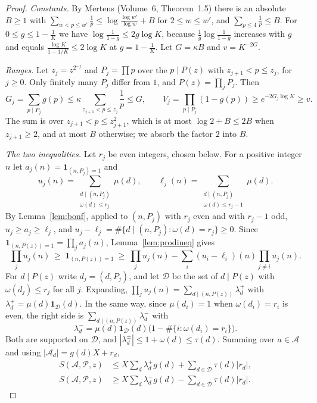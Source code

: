 \begin{proof}
\emph{Constants.} By Mertens (Volume~6, Theorem~1.5) there is an absolute $B\ge1$ with $\sum_{w<p\le w'}\frac1p\le\log\frac{\log w'}{\log w}+B$ for $2\le w\le w'$, and $\sum_{p\le4}\frac1p\le B$. For $0\le g\le1-\frac1K$ we have $\log\frac1{1-g}\le2g\log K$, because $\frac1g\log\frac1{1-g}$ increases with $g$ and equals $\frac{\log K}{1-1/K}\le2\log K$ at $g=1-\frac1K$. Let $G=\kappa B$ and $v=K^{-2G}$.

\emph{Ranges.} Let $z_j=z^{2^{-j}}$ and $P_j=\prod p$ over the $p\mid P(z)$ with $z_{j+1}<p\le z_j$, for $j\ge0$. Only finitely many $P_j$ differ from $1$, and $P(z)=\prod_jP_j$. Then
\[
G_j=\sum_{p\mid P_j}g(p)\le\kappa\sum_{z_{j+1}<p\le z_j}\frac1p\le G,\qquad V_j=\prod_{p\mid P_j}(1-g(p))\ge e^{-2G_j\log K}\ge v.
\]
The sum is over $z_{j+1}<p\le z_{j+1}^2$, which is at most $\log2+B\le2B$ when $z_{j+1}\ge2$, and at most $B$ otherwise; we absorb the factor $2$ into $B$.

\emph{The two inequalities.} Let $r_j$ be even integers, chosen below. For a positive integer $n$ let $a_j(n)=\mathbf 1_{(n,P_j)=1}$ and
\[
u_j(n)=\sum_{\substack{d\mid(n,P_j)\\\omega(d)\le r_j}}\mu(d),\qquad\ell_j(n)=\sum_{\substack{d\mid(n,P_j)\\\omega(d)\le r_j-1}}\mu(d).
\]
By Lemma~\ref{lem:bonf}, applied to $(n,P_j)$ with $r_j$ even and with $r_j-1$ odd, $u_j\ge a_j\ge\ell_j$, and $u_j-\ell_j=\#\{d\mid(n,P_j):\omega(d)=r_j\}\ge0$. Since $\mathbf 1_{(n,P(z))=1}=\prod_ja_j(n)$, Lemma~\ref{lem:prodineq} gives
\[
\prod_ju_j(n)\ \ge\ \mathbf 1_{(n,P(z))=1}\ \ge\ \prod_ju_j(n)-\sum_i(u_i-\ell_i)(n)\prod_{j\ne i}u_j(n).
\]
For $d\mid P(z)$ write $d_j=(d,P_j)$, and let $\mathcal D$ be the set of $d\mid P(z)$ with $\omega(d_j)\le r_j$ for all $j$. Expanding, $\prod_ju_j(n)=\sum_{d\mid(n,P(z))}\lambda^+_d$ with $\lambda^+_d=\mu(d)\mathbf 1_{\mathcal D}(d)$. In the same way, since $\mu(d_i)=1$ when $\omega(d_i)=r_i$ is even, the right side is $\sum_{d\mid(n,P(z))}\lambda^-_d$ with
\[
\lambda^-_d=\mu(d)\mathbf 1_{\mathcal D}(d)\bigl(1-\#\{i:\omega(d_i)=r_i\}\bigr).
\]
Both are supported on $\mathcal D$, and $|\lambda^\pm_d|\le1+\omega(d)\le\tau(d)$. Summing over $a\in\mathcal A$ and using $|\mathcal A_d|=g(d)X+r_d$,
\begin{equation}\label{eq:flsandwich}
\begin{aligned}S(\mathcal A,\mathcal P,z)&\le X\sum_d\lambda^+_dg(d)+\sum_{d\in\mathcal D}\tau(d)|r_d|,\\S(\mathcal A,\mathcal P,z)&\ge X\sum_d\lambda^-_dg(d)-\sum_{d\in\mathcal D}\tau(d)|r_d|.\end{aligned}
\end{equation}


\end{proof}
